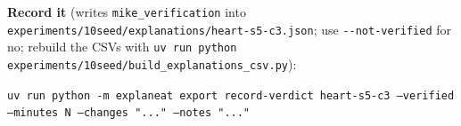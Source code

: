 \documentclass[a4paper,11pt]{article}
\begin{document}
\textbf{Record it} (writes \texttt{mike\_verification} into \texttt{experiments/10seed/explanations/heart-s5-c3.json}; use \texttt{-{}-not-verified} for no; rebuild the CSVs with \texttt{uv run python experiments/10seed/build\_explanations\_csv.py}):

{\footnotesize\raggedright\texttt{uv run python -m explaneat export record-verdict heart-s5-c3 --verified --minutes N --changes "..." --notes "..."}\par}


\clearpage












\clearpage
\end{document}

